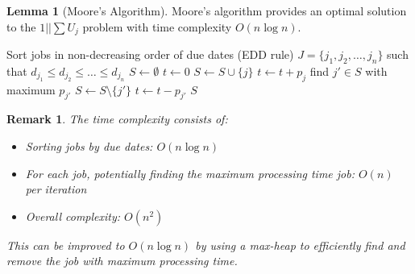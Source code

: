 \documentclass{article}
\newtheorem{remark}{Remark}
\theoremstyle{definition}
\newtheorem{lemma}{Lemma}
\begin{document}
\begin{lemma}[Moore's Algorithm]
Moore's algorithm provides an optimal solution to the $1||\sum U_j$ problem with time complexity $O(n\log n)$.

\begin{algorithm}
\caption{Moore's Algorithm}
\begin{algorithmic}[1]
    \State Sort jobs in non-decreasing order of due dates (EDD rule)
    \State $J = \{j_1, j_2, \ldots, j_n\}$ such that $d_{j_1} \leq d_{j_2} \leq \ldots \leq d_{j_n}$
    \State $S \gets \emptyset$ 
    \State $t \gets 0$ 
        \State $S \gets S \cup \{j\}$ 
        \State $t \gets t + p_j$ 
         
            \State find $j' \in S$ with maximum $p_{j'}$ 
            \State $S \gets S \setminus \{j'\}$ 
            \State $t \gets t - p_{j'}$ 
        \EndIf
    \EndFor
    \State \Return $S$
\EndProcedure
\end{algorithmic}
\end{algorithm}

\begin{remark}
The time complexity consists of:
\begin{itemize}
    \item Sorting jobs by due dates: $O(n \log n)$
    \item For each job, potentially finding the maximum processing time job: $O(n)$ per iteration
    \item Overall complexity: $O(n^2)$
\end{itemize}

This can be improved to $O(n \log n)$ by using a max-heap to efficiently find and remove the job with maximum processing time.
\end{remark}
\end{lemma}
\end{document}
